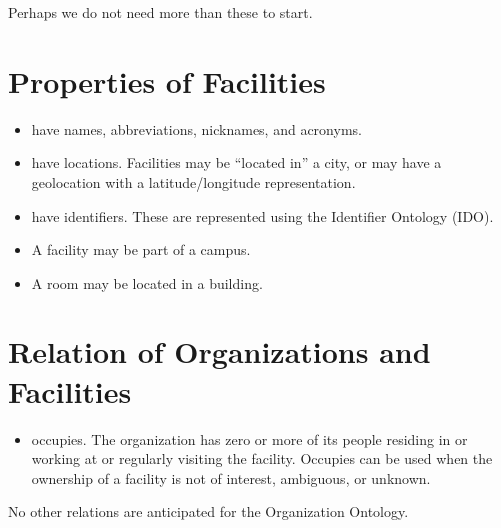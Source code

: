 \documentclass[letterpaper,10pt,english]{sphinxmanual}
\begin{document}
\sphinxAtStartPar
Perhaps we do not need more than these to start.


\section{Properties of Facilities}
\label{\detokenize{facilities:properties-of-facilities}}\begin{itemize}
\item {} 
\sphinxAtStartPar
have names, abbreviations, nicknames, and acronyms.

\item {} 
\sphinxAtStartPar
have locations.  Facilities may be “located in” a city, or may have
a geolocation with a latitude/longitude representation.

\item {} 
\sphinxAtStartPar
have identifiers. These are represented using the Identifier Ontology (IDO).

\item {} 
\sphinxAtStartPar
A facility may be part of a campus.

\item {} 
\sphinxAtStartPar
A room may be located in a building.

\end{itemize}


\section{Relation of Organizations and Facilities}
\label{\detokenize{facilities:relation-of-organizations-and-facilities}}\begin{itemize}
\item {} 
\sphinxAtStartPar
occupies.  The organization has zero or more of its people residing in or working at
or regularly visiting the facility.  Occupies can be used when the ownership
of a facility is not of interest, ambiguous, or unknown.

\end{itemize}

\sphinxAtStartPar
No other relations are anticipated for the Organization Ontology.
\label{\detokenize{locations:locations}}
\ignorespaces 
\end{document}

